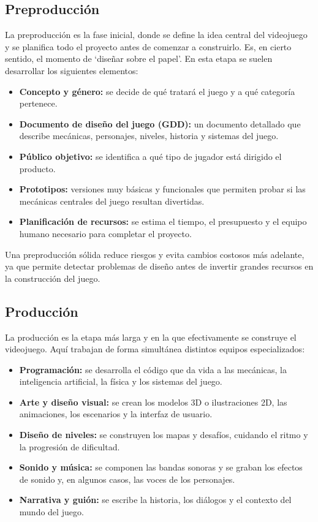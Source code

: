 \documentclass[12pt]{report}
\begin{document}
\subsection{Preproducción}
La preproducción es la fase inicial, donde se define la idea central del videojuego y se planifica todo el proyecto antes de comenzar a construirlo. Es, en cierto sentido, el momento de `diseñar sobre el papel'. En esta etapa se suelen desarrollar los siguientes elementos:

\begin{itemize}
    \item \textbf{Concepto y género:} se decide de qué tratará el juego y a qué categoría pertenece.
    \item \textbf{Documento de diseño del juego (GDD):} un documento detallado que describe mecánicas, personajes, niveles, historia y sistemas del juego.
    \item \textbf{Público objetivo:} se identifica a qué tipo de jugador está dirigido el producto.
    \item \textbf{Prototipos:} versiones muy básicas y funcionales que permiten probar si las mecánicas centrales del juego resultan divertidas.
    \item \textbf{Planificación de recursos:} se estima el tiempo, el presupuesto y el equipo humano necesario para completar el proyecto.
\end{itemize}

Una preproducción sólida reduce riesgos y evita cambios costosos más adelante, ya que permite detectar problemas de diseño antes de invertir grandes recursos en la construcción del juego.

\subsection{Producción}
La producción es la etapa más larga y en la que efectivamente se construye el videojuego. Aquí trabajan de forma simultánea distintos equipos especializados:

\begin{itemize}
    \item \textbf{Programación:} se desarrolla el código que da vida a las mecánicas, la inteligencia artificial, la física y los sistemas del juego.
    \item \textbf{Arte y diseño visual:} se crean los modelos 3D o ilustraciones 2D, las animaciones, los escenarios y la interfaz de usuario.
    \item \textbf{Diseño de niveles:} se construyen los mapas y desafíos, cuidando el ritmo y la progresión de dificultad.
    \item \textbf{Sonido y música:} se componen las bandas sonoras y se graban los efectos de sonido y, en algunos casos, las voces de los personajes.
    \item \textbf{Narrativa y guión:} se escribe la historia, los diálogos y el contexto del mundo del juego.
\end{itemize}
\end{document}
